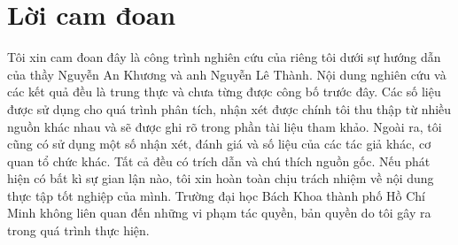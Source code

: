 \chapter*{Lời cam đoan}
Tôi xin cam đoan đây là công trình nghiên cứu của riêng tôi dưới sự hướng
dẫn của thầy Nguyễn An Khương và anh Nguyễn Lê Thành. Nội dung nghiên cứu và các kết quả đều là trung thực và chưa từng được công
bố trước đây. Các số liệu được sử dụng cho quá trình phân tích, nhận xét được chính tôi thu thập từ nhiều nguồn khác nhau và sẽ được ghi rõ trong phần tài liệu tham khảo.
Ngoài ra, tôi cũng có sử dụng một số nhận xét, đánh giá và số liệu của các tác giả
khác, cơ quan tổ chức khác. Tất cả đều có trích dẫn và chú thích nguồn gốc.
Nếu phát hiện có bất kì sự gian lận nào, tôi xin hoàn toàn chịu trách nhiệm về
nội dung thực tập tốt nghiệp của mình. Trường đại học Bách Khoa thành phố Hồ Chí Minh không liên quan đến những vi phạm tác quyền, bản quyền do tôi gây ra trong quá trình thực hiện.